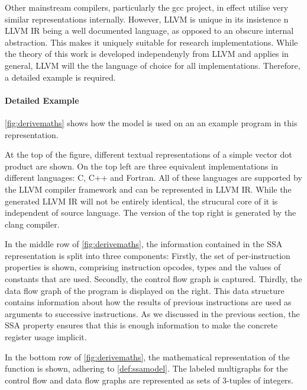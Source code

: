    Other mainstream compilers, particularly the gcc project, in effect utilise
    very similar representations internally.
    However, LLVM is unique in its insistence n LLVM IR being a well documented
    language, as opposed to an obscure internal abstraction.
    This makes it uniquely suitable for research implementations.
    While the theory of this work is developed independenyly from LLVM and
    applies in general, LLVM will the the language of choice for all
    implementations.
    Therefore, a detailed example is required.

\paragraph*{Detailed Example}
    \autoref{fig:derivemaths} shows how the model is used on an an example
    program in this representation.

    At the top of the figure, different textual representations of a simple
    vector dot product are shown.
    On the top left are three equivalent implementations in different languages:
    C, C++ and Fortran.
    All of these languages are supported by the LLVM compiler framework and
    can be represented in LLVM IR.
    While the generated LLVM IR will not be entirely identical, the strucural
    core of it is independent of source language.
    The version of the top right is generated by the clang compiler.

    In the middle row of \autoref{fig:derivemaths}, the information contained in
    the SSA representation is split into three components:
    Firstly, the set of per-instruction properties is shown, comprising
    instruction opcodes, types and the values of constants that are used.
    Secondly, the control flow graph is captured.
    Thirdly, the data flow graph of the program is displayed on the right.
    This data structure contains information about how the results of previous
    instructions are used as arguments to successive instructions.
    As we discussed in the previous section, the SSA property ensures that this
    is enough information to make the concrete register usage implicit.

    In the bottom row of \autoref{fig:derivemaths}, the mathematical
    representation of the function is shown, adhering to \autoref{def:ssamodel}.
    The labeled multigraphs for the control flow and data flow graphs are
    represented as sets of $3$-tuples of integers.

